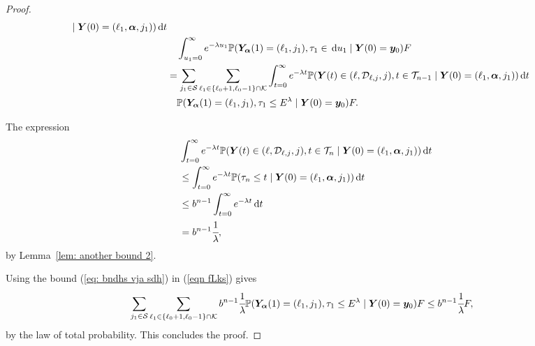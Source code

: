 \begin{proof}
\begin{align}
		\mid \boldsymbol Y(0)=(\ell_1,\boldsymbol \alpha, j_1)) \, \mathrm{d} t 
		\\&\quad{}\int_{u_1=0}^\infty e^{-\lambda u_1}\mathbb P(\bm{Y}_{\bm{\alpha}}(1)=(\ell_1,j_1), \tau_1\in \, \mathrm{d} u_1
		\mid \boldsymbol Y(0)=\boldsymbol y_0)F  \nonumber 
		\\&=\sum_{j_1\in\mathcal S}\sum_{\ell_1\in\{\ell_0+1,\ell_0-1\}\cap\mathcal K} \int_{t=0}^\infty e^{-\lambda t} \mathbb P({\boldsymbol Y}(t) \in (\ell,\mathcal D_{\ell,j},j), t\in\mathcal T_{n-1} \nonumber
		\mid \boldsymbol Y(0)=(\ell_1,\boldsymbol\alpha,j_1)) \, \mathrm{d} t 
		\\&\quad{}\mathbb P(\bm{Y}_{\bm{\alpha}}(1)=(\ell_1,j_1), \tau_1\leq E^\lambda
		\mid \boldsymbol Y(0)=\boldsymbol y_0)F. \label{eqn fLksoioi}
	\end{align}
	
	The expression 
	\begin{align}
		&\int_{t=0}^\infty e^{-\lambda t} \mathbb P( {\boldsymbol Y}(t) \in (\ell,\mathcal D_{\ell,j},j), t\in\mathcal T_n\nonumber
		\mid \boldsymbol Y(0)=(\ell_1,\boldsymbol \alpha,j_1)) \, \mathrm{d} t
		\\&\leq \int_{t=0}^\infty e^{-\lambda t} \mathbb P(\tau_{n}\leq t \nonumber
		\mid \boldsymbol Y(0)=(\ell_1,\boldsymbol\alpha,j_1)) \, \mathrm{d} t
		\\&\leq b^{n-1}\int_{t=0}^\infty e^{-\lambda t} \, \mathrm{d} t \nonumber 
		\\&=b^{n-1}\cfrac{1}{\lambda}, \label{eq: bndhs vja sdh}
	\end{align}
	by Lemma~\ref{lem: another bound 2}.
	
	Using the bound (\ref{eq: bndhs vja sdh}) in (\ref{eqn fLks}) gives 
	\begin{align}
		&\sum_{j_1\in\mathcal S}\sum_{\ell_1\in\{\ell_0+1,\ell_0-1\}\cap\mathcal K} b^{n-1}\cfrac{1}{\lambda} 
		\mathbb P(\bm{Y}_{\bm{\alpha}}(1)=(\ell_1,j_1), \tau_1\leq E^\lambda
		\mid \boldsymbol Y(0)=\boldsymbol y_0)F\leq b^{n-1}\cfrac{1}{\lambda}F, \label{eqn fLksoioi2}
	\end{align}
	by the law of total probability. This concludes the proof. 
\end{proof}

